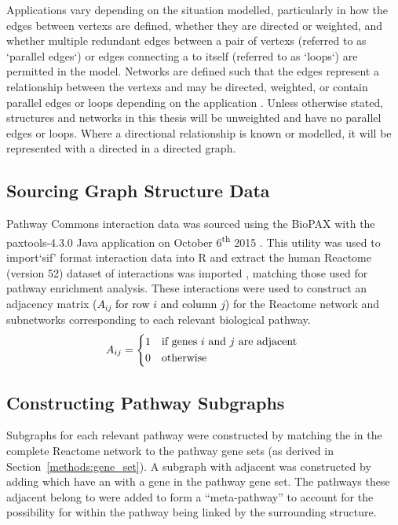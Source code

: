 Applications vary depending on the situation modelled, particularly in how the \glspl{edge} between \glspl{vertex} are defined, whether they are directed or weighted, and whether multiple redundant \glspl{edge} between a pair of \glspl{vertex} (referred to as `parallel \glspl{edge}`) or \glspl{edge} connecting a  to itself (referred to as `loops`) are permitted in the model. Networks are defined such that the \glspl{edge} represent a relationship between the \glspl{vertex} and may be directed, weighted, or contain parallel \glspl{edge} or loops depending on the application \citep{vanSteen2010}. Unless otherwise stated,  structures and networks in this thesis will be unweighted and have no parallel \glspl{edge} or loops. Where a directional relationship is known or modelled, it will be represented with a directed  in a directed graph.

\subsection{Sourcing Graph Structure Data} \label{methods:graph_data}
Pathway Commons interaction data was sourced using the \gls{BioPAX} with the paxtools-4.3.0 Java application on October 6\textsuperscript{th} 2015 \citep{PathwayCommons, paxtools}. This utility was used to import`sif' format interaction data into R \citep{R_core} and extract the human Reactome (version 52) dataset of interactions was imported \citep{Reactome}, matching those used for \gls{pathway} enrichment analysis. These interactions were used to construct an adjacency matrix \textcolor{black}{($A_{ij}$ for row $i$ and column $j$)} for the Reactome network and subnetworks corresponding to each relevant biological \gls{pathway}. 
\textcolor{black}{
\[
A_{ij} = 
\begin{dcases*}
   1                         & if genes $i$ and $j$ are adjacent \\
   0                         & otherwise
\end{dcases*}
\]
}
\subsection{Constructing Pathway Subgraphs} \label{methods:subgraphs}
Subgraphs for each relevant \gls{pathway} were constructed by matching the  in the complete Reactome network to the \gls{pathway} gene sets (as derived in Section~\ref{methods:gene_set}). A subgraph with adjacent  was constructed by adding  which have an  with a gene in the \gls{pathway} gene set. The \glspl{pathway} these adjacent  belong to were added to form a ``meta-\gls{pathway}'' to account for the possibility for  within the \gls{pathway} being linked by the surrounding  structure.

